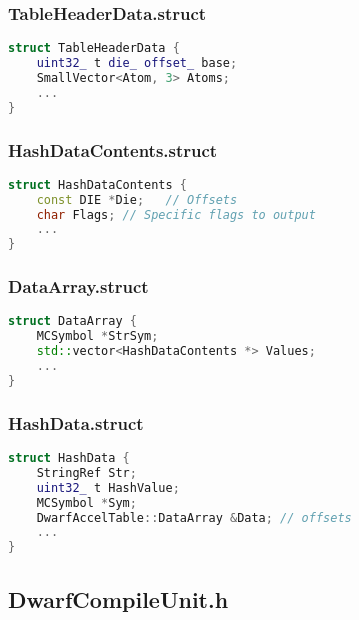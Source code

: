 \documentclass{ctexart}
\begin{document}
\subsubsection{TableHeaderData.struct}
\begin{lstlisting}[language=C++]
struct TableHeaderData {
	uint32_ t die_ offset_ base;
	SmallVector<Atom, 3> Atoms;
	...
}
\end{lstlisting}

\subsubsection{HashDataContents.struct}
\begin{lstlisting}[language=C++]
struct HashDataContents {
	const DIE *Die;   // Offsets
	char Flags; // Specific flags to output
	...
}
\end{lstlisting}

\subsubsection{DataArray.struct}
\begin{lstlisting}[language=C++]
struct DataArray {
	MCSymbol *StrSym;
	std::vector<HashDataContents *> Values;
	...
}
\end{lstlisting}

\subsubsection{HashData.struct}
\begin{lstlisting}[language=C++]
struct HashData {
	StringRef Str;
	uint32_ t HashValue;
	MCSymbol *Sym;
	DwarfAccelTable::DataArray &Data; // offsets
	...
}
\end{lstlisting}




\subsection{DwarfCompileUnit.h}

\end{document}

